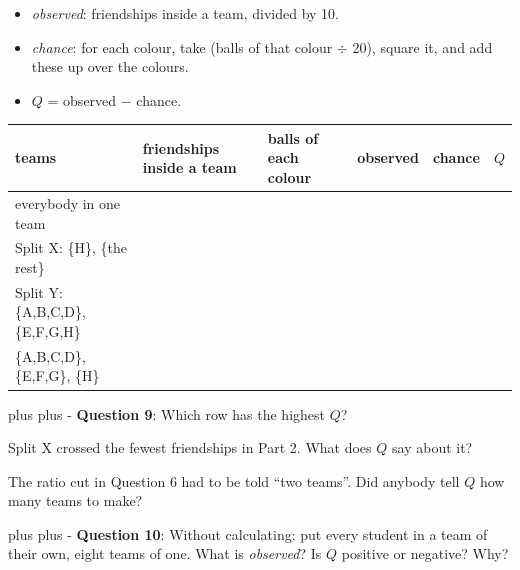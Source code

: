 \documentclass[a4paper, 14pt]{extarticle}
\newcommand{\needroom}[1]{%
  \par
  \begingroup
    \setlength{\dimen0}{#1}%
    \vskip 0pt plus \dimen0
    \penalty -100%
    \vskip 0pt plus -\dimen0
  \endgroup}
\begin{document}
\begin{itemize}[leftmargin=1.5em, itemsep=0pt, topsep=2pt]
\item \emph{observed}: friendships inside a team, divided by 10.
\item \emph{chance}: for each colour, take (balls of that colour $\div$ 20),
  square it, and add these up over the colours.
\item $Q$ = observed $-$ chance.
\end{itemize}

\begin{center}
\renewcommand{\arraystretch}{1.25}
\begin{tabular}{|>{\raggedright\arraybackslash}p{4.0cm}|C{2.5cm}|C{2.4cm}|C{2cm}|C{1.8cm}|C{1.3cm}|}
\hline
teams & friendships inside a team & balls of each colour & observed & chance & $Q$ \\
\hline
everybody in one team & & & & & \\[1.1cm]
\hline
Split X: \{H\}, \{the rest\} & & & & & \\[1.1cm]
\hline
Split Y: \{A,B,C,D\}, \{E,F,G,H\} & & & & & \\[1.1cm]
\hline
\{A,B,C,D\}, \{E,F,G\}, \{H\} & & & & & \\[1.1cm]
\hline
\end{tabular}
\end{center}

\needroom{4\baselineskip}%
{\bf Question 9}: Which row has the highest $Q$?

Split X crossed the fewest friendships in Part 2. What does $Q$ say about it?

The ratio cut in Question 6 had to be told ``two teams''. Did anybody tell $Q$
how many teams to make?

\needroom{3\baselineskip}%
{\bf Question 10}: Without calculating: put every student in a team of their
own, eight teams of one. What is \emph{observed}? Is $Q$ positive or negative?
Why?
\end{document}
